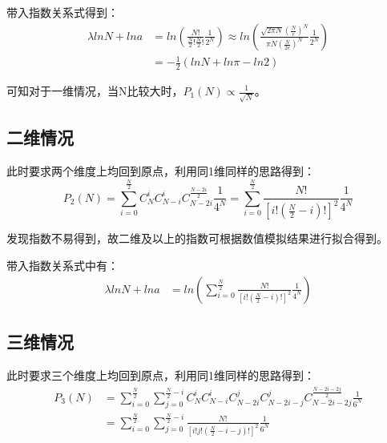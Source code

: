 \documentclass[a4paper,11pt]{article}
\begin{document}
带入指数关系式得到：
\begin{equation}
\begin{aligned}
\lambda ln N + ln a &= ln \left(    \frac{N!}{\frac{N}{2}!\frac{N}{2}!}\frac{1}{2^{N}}    \right)	\approx ln \left(  \frac{\sqrt{2\pi N}(\frac{N}{e})^{N}}{\pi N (\frac{N}{2e})^{N}}  \frac{1}{2^{N}}   \right) \\
&= -\frac{1}{2}\left(  ln N + ln \pi -ln 2 \right)
\end{aligned}
\end{equation}

可知对于一维情况，当N比较大时，$P_{1}(N) \propto \frac{1}{\sqrt{N}}$。

\subsection{二维情况}
此时要求两个维度上均回到原点，利用同1维同样的思路得到：
\begin{equation}
	P_{2}(N) =   \sum_{i=0}^{\frac{N}{2}} C_{N}^{i}  C_{N-i}^{i} C_{N-2i}^{\frac{N-2i}{2}} \frac{1}{4^{N}}  =   \sum_{i=0}^{\frac{N}{2}} \frac{N!}{[i!(\frac{N}{2}-i)!]^{2}}\frac{1}{4^{N}} 
\end{equation}

发现指数不易得到，故二维及以上的指数可根据数值模拟结果进行拟合得到。

带入指数关系式中有：
\begin{equation}
\begin{aligned}
	\lambda ln N + ln a &= ln \left(   \sum_{i=0}^{\frac{N}{2}} \frac{N!}{[i!(\frac{N}{2}-i)!]^{2}}\frac{1}{4^{N}}    \right)
\end{aligned}
\end{equation}


\subsection{三维情况}
此时要求三个维度上均回到原点，利用同1维同样的思路得到：
\begin{equation}
\begin{aligned}
	P_{3}(N) &=  \sum_{i=0}^{\frac{N}{2}} \sum_{j=0}^{\frac{N}{2}-i} C_{N}^{i}  C_{N-i}^{i} C_{N-2i}^{j} C_{N-2i-j}^{j} C_{N-2i-2j}^{\frac{N-2i-2j}{2}} \frac{1}{6^{N}}  \\
	&=   \sum_{i=0}^{\frac{N}{2}} \sum_{j=0}^{\frac{N}{2}-i} \frac{N!}{[i!j!(\frac{N}{2}-i-j)!]^{2}}\frac{1}{6^{N}}
\end{aligned}
\end{equation}
\end{document}
